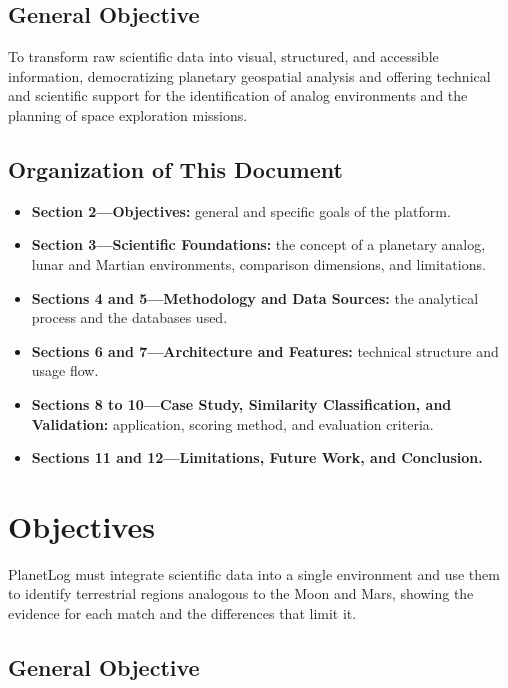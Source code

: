 \documentclass[12pt,letterpaper]{article}
\begin{document}
\subsection{General Objective}

To transform raw scientific data into visual, structured, and accessible information, democratizing planetary geospatial analysis and offering technical and scientific support for the identification of analog environments and the planning of space exploration missions.

\subsection{Organization of This Document}

\begin{itemize}
  \item \textbf{Section 2---Objectives:} general and specific goals of the platform.
  \item \textbf{Section 3---Scientific Foundations:} the concept of a planetary analog, lunar and Martian environments, comparison dimensions, and limitations.
  \item \textbf{Sections 4 and 5---Methodology and Data Sources:} the analytical process and the databases used.
  \item \textbf{Sections 6 and 7---Architecture and Features:} technical structure and usage flow.
  \item \textbf{Sections 8 to 10---Case Study, Similarity Classification, and Validation:} application, scoring method, and evaluation criteria.
  \item \textbf{Sections 11 and 12---Limitations, Future Work, and Conclusion.}
\end{itemize}

\section{Objectives}

PlanetLog must integrate scientific data into a single environment and use them to identify terrestrial regions analogous to the Moon and Mars, showing the evidence for each match and the differences that limit it.

\subsection{General Objective}
\end{document}
